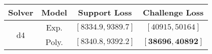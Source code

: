 \begin{tabular}{cc|c|c} 
\hline 
 Solver & Model & Support Loss  & Challenge Loss \tabularnewline\hline 
\hline 
\multirow{2}{*}{d4} & Exp. & $\left[8334.9,9389.7\right]$ & $\left[40915,50164\right]$ \tabularnewline 
 & Poly. & $\mathbf{\left[8340.8,9392.2\right]}$ & $\mathbf{\left[38696,40892\right]}$ \tabularnewline 
\hline 
\end{tabular} 

